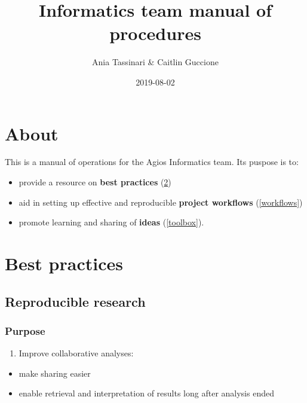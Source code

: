 \documentclass[openany]{article}
\title{Informatics team manual of procedures}
\author{Ania Tassinari \& Caitlin Guccione}
\date{2019-08-02}
\providecommand{\tightlist}{%
  \setlength{\itemsep}{0pt}\setlength{\parskip}{0pt}}
\begin{document}
\maketitle

{
\hypersetup{linkcolor=black}
\setcounter{tocdepth}{2}
\tableofcontents
}
\hypertarget{about}{%
\section{About}\label{about}}

This is a manual of operations for the Agios Informatics team. Its puspose is to:

\begin{itemize}
\tightlist
\item
  provide a resource on \textbf{best practices} (\ref{bestpractices})
\item
  aid in setting up effective and reproducible \textbf{project workflows} (\ref{workflows})
\item
  promote learning and sharing of \textbf{ideas} (\ref{toolbox}).
\end{itemize}

\hypertarget{bestpractices}{%
\section{Best practices}\label{bestpractices}}

\hypertarget{reproducible-research}{%
\subsection{Reproducible research}\label{reproducible-research}}

\hypertarget{purpose}{%
\subsubsection{Purpose}\label{purpose}}

\begin{enumerate}
\def\labelenumi{\arabic{enumi}.}
\tightlist
\item
  Improve collaborative analyses:
\end{enumerate}

\begin{itemize}
\tightlist
\item
  make sharing easier
\item
  enable retrieval and interpretation of results long after analysis ended
\end{itemize}
\end{document}
